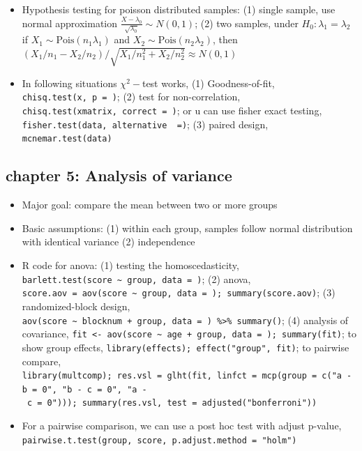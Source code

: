 \documentclass{article}
\begin{document}
\begin{itemize}
\tightlist
\item
  Hypothesis testing for poisson distributed samples: (1) single sample,
  use normal approximation
  \(\frac{X - \lambda_0}{\sqrt{\lambda_0}} \sim N(0, 1)\); (2) two
  samples, under \(H_0: \lambda_1 = \lambda_2\) if
  \(X_1 \sim \text{Pois}(n_1\lambda_1)\) and
  \(X_2 \sim \text{Pois}(n_2\lambda_2)\), then
  \((X_1/n_1 - X_2/n_2)/\sqrt{X_1/n_1^2 + X_2/n_2^2}\approx N(0, 1)\)
\item
  In following situations \(\chi^2-\)test works, (1) Goodness-of-fit,
  \texttt{chisq.test(x,\ p\ =\ )}; (2) test for non-correlation,
  \texttt{chisq.test(xmatrix,\ correct\ =\ )}; or u can use fisher exact
  testing, \texttt{fisher.test(data,\ alternative\ \ =)}; (3) paired
  design, \texttt{mcnemar.test(data)}
\end{itemize}

\hypertarget{chapter-5-analysis-of-variance}{%
\subsection{chapter 5: Analysis of
variance}\label{chapter-5-analysis-of-variance}}

\begin{itemize}
\tightlist
\item
  Major goal: compare the mean between two or more groups
\item
  Basic assumptions: (1) within each group, samples follow normal
  distribution with identical variance (2) independence
\item
  R code for anova: (1) testing the homoscedasticity,
  \texttt{barlett.test(score\ \textasciitilde{}\ group,\ data\ =\ )};
  (2) anova,
  \texttt{score.aov\ =\ aov(score\ \textasciitilde{}\ group,\ data\ =\ );\ summary(score.aov)};
  (3) randomized-block design,
  \texttt{aov(score\ \textasciitilde{}\ blocknum\ +\ group,\ data\ =\ )\ \%\textgreater{}\%\ summary()};
  (4) analysis of covariance,
  \texttt{fit\ \textless{}-\ aov(score\ \textasciitilde{}\ age\ +\ group,\ data\ =\ );\ summary(fit)};
  to show group effects,
  \texttt{library(effects);\ effect("group",\ fit)}; to pairwise
  compare,
  \texttt{library(multcomp);\ res.vsl\ =\ glht(fit,\ linfct\ =\ mcp(group\ =\ c("a\ -b\ =\ 0",\ "b\ -\ c\ =\ 0",\ "a\ -\ c\ =\ 0")));\ summary(res.vsl,\ test\ =\ adjusted("bonferroni"))}
\item
  For a pairwise comparison, we can use a post hoc test with adjust
  p-value,
  \texttt{pairwise.t.test(group,\ score,\ p.adjust.method\ =\ "holm")}
\end{itemize}
\end{document}

